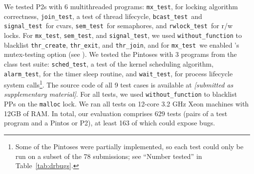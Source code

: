 \newcommand\mxtest{\texttt{mx\_test}}
\newcommand\tej{\texttt{join\_test}}
\newcommand\bct{\texttt{bcast\_test}}
\newcommand\paraguay{\texttt{signal\_test}}
\newcommand\paradise{\texttt{sem\_test}}
\newcommand\rwldgr{\texttt{rwlock\_test}}
We tested P2s with 6 multithreaded programs:
\mxtest, for locking algorithm correctness,
\tej, a test of thread lifecycle,
\bct~and \paraguay~for cvars,
\paradise~for semaphores,
and \rwldgr~for r/w locks.
For \mxtest, \paradise, and \paraguay, we used {\tt without\_function} to blacklist {\tt thr\_create}, {\tt thr\_exit}, and {\tt thr\_join},
and for \mxtest~we enabled \landslide's mutex-testing option
(see \sect{\ref{sec:landslide}}).
\newcommand\prisema{\texttt{sched\_test}}
\newcommand\waitsimple{\texttt{wait\_test}}
\newcommand\alarmsimul{\texttt{alarm\_test}}
We tested the Pintoses with 3 programs from the class test suite: \prisema, a test of the kernel scheduling algorithm,
\alarmsimul, for the timer sleep routine,
and \waitsimple, for process lifecycle system calls\footnote{
	Some of the Pintoses were partially implemented,
	so each test could only be run on a subset of the 78 submissions; see ``Number tested'' in Table~\ref{tab:drbugs}.
}.
The source code of all 9 test cases is available at
{\em [submitted as supplementary material]}.
For all tests, we used {\tt without\_function} to blacklist PPs on the {\tt malloc} lock.
We ran all tests on 12-core 3.2 GHz Xeon machines with 12GB of RAM.
In total, our evaluation comprises 629 tests (pairs of a test program and a Pintos or P2),
at least 163 of which could expose bugs.

